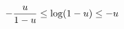 \documentclass[preview]{standalone}
\begin{document}
\begin{align*}
\special{dvisvgm:raw <g id='unique000'>}-\frac{u}{1-u}\le\log(1-u)\le-u\special{dvisvgm:raw </g>}
\end{align*}
\end{document}
